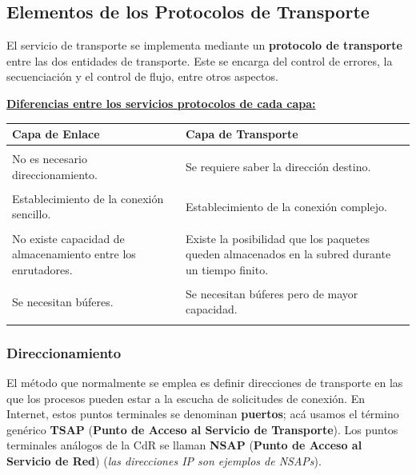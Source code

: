 \documentclass[10pt,a4paper]{article}
\begin{document}
\subsection{Elementos de los Protocolos de Transporte}

El servicio de transporte se implementa mediante un \textbf{protocolo de transporte} entre las dos entidades de transporte. Este se encarga del control de errores, la secuenciación y el control de flujo, entre otros aspectos.

\underline{\textbf{Diferencias entre los servicios protocolos de cada capa:}}

\begin{tabular}{p{7.5cm}p{7.5cm}}
{\bf Capa de Enlace} & {\bf Capa de Transporte} \\\hline \\ [-1.5ex]
No es necesario direccionamiento.
&
Se requiere saber la dirección destino.
\\ [1ex] \hline \\ [-1.5ex]
Establecimiento de la conexión sencillo.
&
Establecimiento de la conexión complejo.
\\ [1ex] \hline \\ [-1.5ex]
No existe capacidad de almacenamiento entre los enrutadores.
&
Existe la posibilidad que los paquetes queden almacenados en la subred durante un tiempo finito.
\\ [1ex] \hline \\ [-1.5ex]
Se necesitan búferes.
&
Se necesitan búferes pero de mayor capacidad.
\\ [1ex] \hline \\ [-1.5ex]
\end{tabular}

\subsubsection{Direccionamiento}

El método que normalmente se emplea es definir direcciones de transporte en las que los procesos pueden estar a la escucha de solicitudes de conexión. En Internet, estos puntos terminales se denominan \textbf{puertos}; acá usamos el término genérico \textbf{TSAP} (\textbf{Punto de Acceso al Servicio de Transporte}). Los puntos terminales análogos de la CdR se llaman \textbf{NSAP} (\textbf{Punto de Acceso al Servicio de Red}) (\textit{las direcciones IP son ejemplos de NSAPs}).
\end{document}
